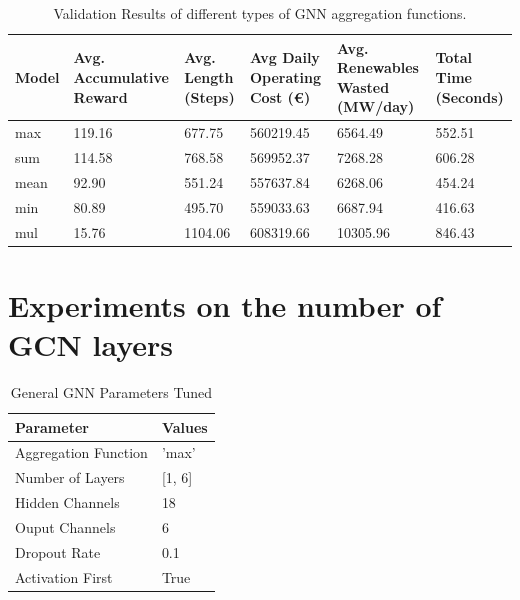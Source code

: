 	\begin{table}[ht]
		\centering
		\begin{tabularx}{\textwidth}{|l|X|X|X|X|X|}
			\hline
			\textbf{Model} & \textbf{Avg. Accumulative Reward}& \textbf{Avg. Length (Steps)} & \textbf{Avg Daily Operating Cost (€)} & \textbf{Avg. Renewables Wasted (MW/day)} & \textbf{Total Time (Seconds)}\\
			\hline
			max & 119.16 & 677.75 & 560219.45 & 6564.49 & 552.51\\
			sum & 114.58 & 768.58 & 569952.37 & 7268.28 &  606.28 \\
			mean & 92.90 &  551.24 & 557637.84 & 6268.06 & 454.24 \\
			min & 80.89 & 495.70 & 559033.63 & 6687.94 & 416.63 \\
			mul & 15.76 & 1104.06 & 608319.66 & 10305.96 & 846.43 \\
			\hline
		\end{tabularx}
		\caption{Validation Results of different types of \ac{GNN} aggregation functions.}
		\label{table:aggr-val}
	\end{table}

\section{Experiments on the number of \ac{GCN} layers}

\begin{table}
	\begin{tabular}{|l|l|}
		\hline
		\textbf{Parameter} & \textbf{Values} \\
		\hline
		Aggregation Function & 'max' \\
		\hline
		Number of Layers & [1, 6] \\
		\hline
		Hidden Channels & 18 \\
		\hline
		Ouput Channels & 6 \\
		\hline 
		Dropout Rate & 0.1 \\
		\hline
		Activation First & True \\
		\hline 
		\hline
	\end{tabular}
	\caption{General \ac{GNN} Parameters Tuned}
\end{table}

